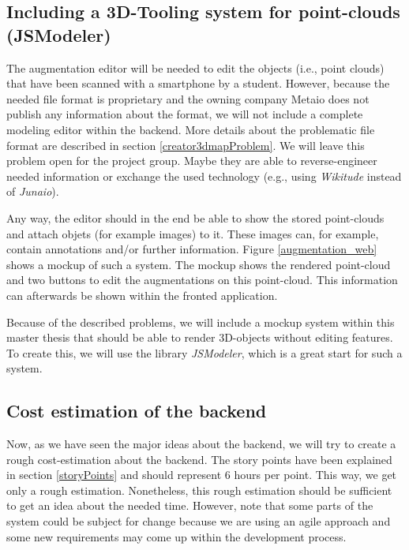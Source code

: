 \subsection{Including a 3D-Tooling system for point-clouds (JSModeler)}
\label{modelingObjects}
The augmentation editor will be needed to edit the objects (i.e., point clouds) that have been scanned with a smartphone by a student. However, because the needed file format is proprietary and the owning company Metaio does not publish any information about the format, we will not include a complete modeling editor within the backend. More details about the problematic file format are described in section \ref{creator3dmapProblem}. We will leave this problem open for the project group. Maybe they are able to reverse-engineer needed information or exchange the used technology (e.g., using \emph{Wikitude} instead of \emph{Junaio}).

Any way, the editor should in the end be able to show the stored point-clouds and attach objets (for example images) to it. These images can, for example, contain annotations and/or further information. Figure \ref{augmentation_web} shows a mockup of such a system. The mockup shows the rendered point-cloud and two buttons to edit the augmentations on this point-cloud. This information can afterwards be shown within the fronted application.

Because of the described problems, we will include a mockup system within this master thesis that should be able to render 3D-objects without editing features. To create this, we will use the library \emph{JSModeler}, which is a great start for such a system.


\subsection{Cost estimation of the backend}
\label{backendEstimation}
Now, as we have seen the major ideas about the backend, we will try to create a rough cost-estimation about the backend. The story points have been explained in section \ref{storyPoints} and should represent 6 hours per point. This way, we get only a rough estimation. Nonetheless, this rough estimation should be sufficient to get an idea about the needed time. However, note that some parts of the system could be subject for change because we are using an agile approach and some new requirements may come up within the development process.

